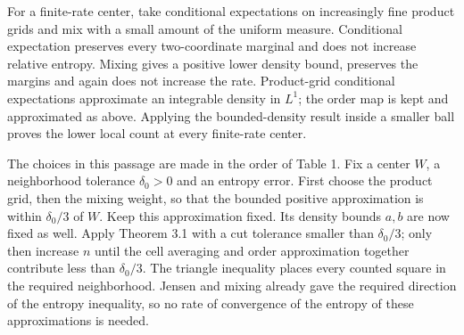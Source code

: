 \documentclass[english,11pt,a4paper]{article}
\begin{document}
For a finite-rate center, take conditional expectations on increasingly fine product grids and mix with a small amount of the uniform measure. Conditional expectation preserves every two-coordinate marginal and does not increase relative entropy. Mixing gives a positive lower density bound, preserves the margins and again does not increase the rate. Product-grid conditional expectations approximate an integrable density in \(L^1\); the order map is kept and approximated as above. Applying the bounded-density result inside a smaller ball proves the lower local count at every finite-rate center.

The choices in this passage are made in the order of Table 1. Fix a center \(W\), a neighborhood tolerance \(\delta_0>0\) and an entropy error. First choose the product grid, then the mixing weight, so that the bounded positive approximation is within \(\delta_0/3\) of \(W\). Keep this approximation fixed. Its density bounds \(a,b\) are now fixed as well. Apply Theorem 3.1 with a cut tolerance smaller than \(\delta_0/3\); only then increase \(n\) until the cell averaging and order approximation together contribute less than \(\delta_0/3\). The triangle inequality places every counted square in the required neighborhood. Jensen and mixing already gave the required direction of the entropy inequality, so no rate of convergence of the entropy of these approximations is needed.
\end{document}
